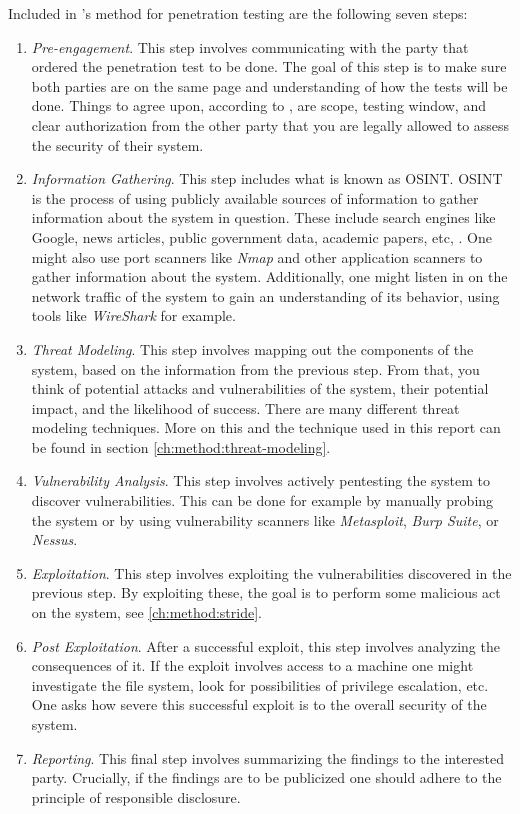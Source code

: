 Included in \citeauthor{weidman2014}'s method for penetration testing are the following seven steps:
\begin{enumerate}
    \item \textit{Pre-engagement}. This step involves communicating with the party that ordered the penetration test to be done. The goal of this step is to make sure both parties are on the same page and understanding of how the tests will be done. Things to agree upon, according to \citeauthor{weidman2014}, are scope, testing window, and clear authorization from the other party that you are legally allowed to assess the security of their system.
    \item \textit{Information Gathering}. This step includes what is known as \gls{OSINT}. \gls{OSINT} is the process of using publicly available sources of information to gather information about the system in question. These include search engines like Google, news articles, public government data, academic papers, etc, \cite{steele2007open}. One might also use port scanners like \textit{Nmap} and other application scanners to gather information about the system. Additionally, one might listen in on the network traffic of the system to gain an understanding of its behavior, using tools like \textit{WireShark} for example.
    \item \textit{Threat Modeling}. This step involves mapping out the components of the system, based on the information from the previous step. From that, you think of potential attacks and vulnerabilities of the system, their potential impact, and the likelihood of success. There are many different threat modeling techniques. More on this and the technique used in this report can be found in section \ref{ch:method:threat-modeling}.
    \item \textit{Vulnerability Analysis}. This step involves actively pentesting the system to discover vulnerabilities. This can be done for example by manually probing the system or by using vulnerability scanners like \textit{Metasploit}, \textit{Burp Suite}, or \textit{Nessus}.
    \item \textit{Exploitation}. This step involves exploiting the vulnerabilities discovered in the previous step. By exploiting these, the goal is to perform some malicious act on the system, see \ref{ch:method:stride}.
    \item \textit{Post Exploitation}. After a successful exploit, this step involves analyzing the consequences of it. If the exploit involves access to a machine one might investigate the file system, look for possibilities of privilege escalation, etc. One asks how severe this successful exploit is to the overall security of the system.
    \item \textit{Reporting}. This final step involves summarizing the findings to the interested party. Crucially, if the findings are to be publicized one should adhere to the principle of responsible disclosure.
\end{enumerate}
